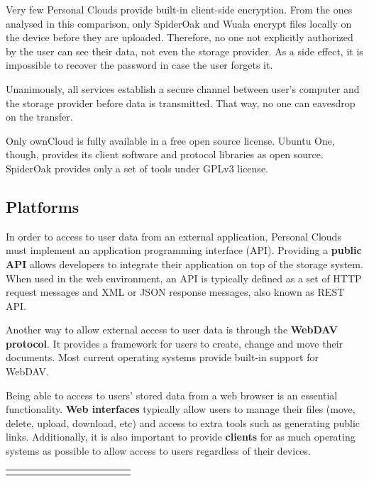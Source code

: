 {Very few Personal Clouds provide built-in client-side encryption. From the ones analysed in this comparison, only SpiderOak and Wuala encrypt files locally on the device before they are uploaded. Therefore, no one not explicitly authorized by the user can see their data, not even the storage provider. As a side effect, it is impossible to recover the password in case the user forgets it.

Unanimously, all services establish a secure channel between user's computer and the storage provider before data is transmitted. That way, no one can eavesdrop on the transfer.

Only ownCloud is fully available in a free open source license. Ubuntu One, though, provides its client software and protocol libraries as open source. SpiderOak provides only a set of tools under GPLv3 license.



\subsection{Platforms}


In order to access to user data from an external application, Personal Clouds must implement an application programming interface (API). Providing a \textbf{public API} allows developers to integrate their application on top of the storage system. When used in the web environment, an API is typically defined as a set of HTTP request messages and XML or JSON response messages, also known as REST API.

Another way to allow external access to user data is through the \textbf{WebDAV protocol}. It provides a framework for users to create, change and move their documents. Most current operating systems provide built-in support for WebDAV.

Being able to access to users' stored data from a web browser is an essential functionality. \textbf{Web interfaces} typically allow users to manage their files (move, delete, upload, download, etc) and access to extra tools such as generating public links. Additionally, it is also important to provide \textbf{clients} for as much operating systems as possible to allow access to users regardless of their devices.


{
\def\arraystretch{1.5}

\begin{table}
\begin{center}
    \begin{tabular}{ | p{3.0cm} | p{0.9cm} | p{0.9cm} | p{0.9cm} | p{0.9cm} | p{0.9cm} | p{0.9cm} | p{0.9cm} | p{0.9cm} | p{0.9cm} | p{0.9cm} | }
    \hline
    \rowcolor[gray]{0.8}


\end{tabular}
\end{center}
\end{table}}}
